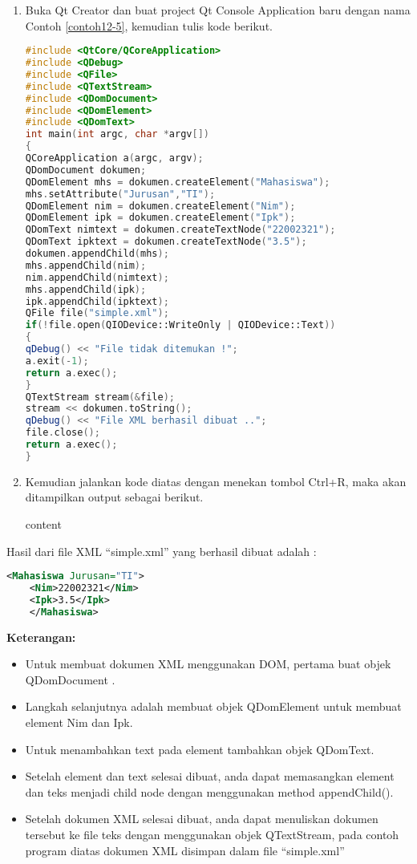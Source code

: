 \begin{enumerate}

\item
  Buka Qt Creator dan buat project Qt Console Application baru dengan
  nama Contoh \ref{contoh12-5}, kemudian tulis kode berikut.

\begin{lstlisting}[language=c++, caption=Membuat Nodes untuk membuat simple XML Document, label=contoh12-5]
#include <QtCore/QCoreApplication>
#include <QDebug>
#include <QFile>
#include <QTextStream>
#include <QDomDocument>
#include <QDomElement>
#include <QDomText>
int main(int argc, char *argv[])
{
QCoreApplication a(argc, argv);
QDomDocument dokumen;
QDomElement mhs = dokumen.createElement("Mahasiswa");
mhs.setAttribute("Jurusan","TI");
QDomElement nim = dokumen.createElement("Nim");
QDomElement ipk = dokumen.createElement("Ipk");
QDomText nimtext = dokumen.createTextNode("22002321");
QDomText ipktext = dokumen.createTextNode("3.5");
dokumen.appendChild(mhs);
mhs.appendChild(nim);
nim.appendChild(nimtext);
mhs.appendChild(ipk);
ipk.appendChild(ipktext);
QFile file("simple.xml");
if(!file.open(QIODevice::WriteOnly | QIODevice::Text))
{
qDebug() << "File tidak ditemukan !";
a.exit(-1);
return a.exec();
}
QTextStream stream(&file);
stream << dokumen.toString();
qDebug() << "File XML berhasil dibuat ..";
file.close();
return a.exec();
}
\end{lstlisting}
\item
  Kemudian jalankan kode diatas dengan menekan tombol Ctrl+R, maka akan
  ditampilkan output sebagai berikut.
  
  \begin{lcverbatim}
  	content
  \end{lcverbatim}
\end{enumerate}

Hasil dari file XML ``simple.xml'' yang berhasil dibuat adalah :

 \begin{lstlisting}[language=xml]
 	<Mahasiswa Jurusan="TI">
 	<Nim>22002321</Nim>
 	<Ipk>3.5</Ipk>
 	</Mahasiswa>
 \end{lstlisting}

\textbf{Keterangan:}

\begin{itemize}

\item
  Untuk membuat dokumen XML menggunakan DOM, pertama buat objek
  QDomDocument .
\item
  Langkah selanjutnya adalah membuat objek QDomElement untuk membuat
  element Nim dan Ipk.
\item
  Untuk menambahkan text pada element tambahkan objek QDomText.
\item
  Setelah element dan text selesai dibuat, anda dapat memasangkan
  element dan teks menjadi child node dengan menggunakan method
  appendChild().
\item
  Setelah dokumen XML selesai dibuat, anda dapat menuliskan dokumen
  tersebut ke file teks dengan menggunakan objek QTextStream, pada
  contoh program diatas dokumen XML disimpan dalam file ``simple.xml''
\end{itemize}

